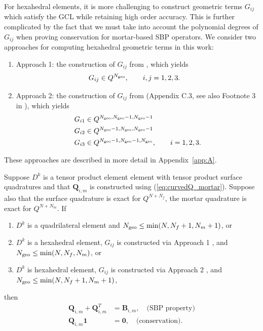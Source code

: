 \documentclass{svjour3}                     %
\begin{document}
For hexahedral elements, it is more challenging to construct geometric terms $G_{ij}$ which satisfy the GCL while retaining high order accuracy.  This is further complicated by the fact that we must take into account the polynomial degrees of $G_{ij}$ when proving conservation for mortar-based SBP operators.  We consider two approaches for computing hexahedral geometric terms in this work:
\begin{enumerate}
\item Approach 1: the construction of $G_{ij}$ from \cite{kopriva2006metric}, which yields 
\begin{align*}
&G_{ij} \in Q^{N_{\rm geo}}, \qquad i,j = 1,2,3.
\end{align*}
\item Approach 2: the construction of $G_{ij}$ from \cite{kozdon2018energy} (Appendix C.3, see also Footnote 3 in \cite{chan2019skew}), which yields
\begin{align*}
&G_{i1} \in Q^{N_{\rm geo},N_{\rm geo}-1,N_{\rm geo}-1}\\
&G_{i2} \in Q^{N_{\rm geo}-1,N_{\rm geo},N_{\rm geo}-1}\\
&G_{i3} \in Q^{N_{\rm geo}-1,N_{\rm geo}-1,N_{\rm geo}}, \qquad i = 1,2,3.
\end{align*}
\end{enumerate}
These approaches are described in more detail in Appendix~\ref{app:A}.  
\begin{lemma}
\label{lemma:Qmprops_3d}
Suppose $D^k$ is a tensor product element element with tensor product surface quadratures and that $\bm{Q}_{i,m}$ is constructed using (\ref{eq:curvedQ_mortar}).  Suppose also that the surface quadrature is exact for $Q^{N+N_f}$,  the mortar quadrature is exact for $Q^{N+N_m}$.  If 
\begin{enumerate}
\item $D^k$ is a quadrilateral element and $N_{\rm geo} \leq \min(N,N_f+1,N_m+1)$, or
\item $D^k$ is a hexahedral element, $G_{ij}$ is constructed via Approach 1 \cite{kopriva2006metric}, and $N_{\rm geo} \leq \min(N,N_f,N_m)$, or
\item $D^k$ is hexahedral element, $G_{ij}$ is constructed via Approach 2 \cite{kozdon2018energy}, and $N_{\rm geo} \leq \min(N,N_f+1,N_m+1)$, 
\end{enumerate}
then 
\begin{align*}
\bm{Q}_{i,m} + \bm{Q}_{i,m}^T &= \bm{B}_{i,m}, \quad \text{(SBP property)}\\
\bm{Q}_{i,m}\bm{1} &= \bm{0}, \quad \text{(conservation)}.
\end{align*}
\end{lemma}
\end{document}
